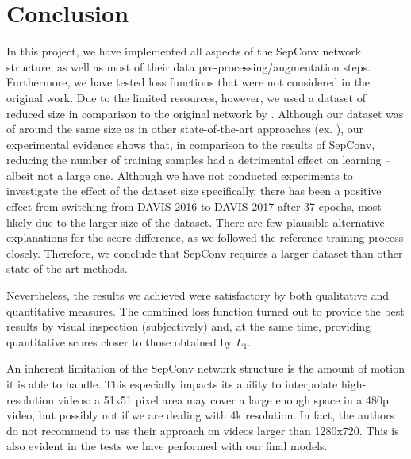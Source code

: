 \documentclass[10pt,twocolumn,letterpaper]{article}
\begin{document}

\vspace{-0.5em}
\section{Conclusion}
\label{sec:conclusion}

\vspace{-0.5em}
In this project, we have implemented all aspects of the SepConv network structure, as well as most of their data pre-processing/augmentation steps. Furthermore, we have tested loss functions that were not considered in the original work. Due to the limited resources, however, we used a dataset of reduced size in comparison to the original network by \citeauthor{SepConv}. Although our dataset was of around the same size as in other state-of-the-art approaches (ex. \cite{PhaseNet}), our experimental evidence shows that, in comparison to the results of SepConv, reducing the number of training samples had a detrimental effect on learning -- albeit not a large one. Although we have not conducted experiments to investigate the effect of the dataset size specifically, there has been a positive effect from switching from DAVIS 2016 to DAVIS 2017 after 37 epochs, most likely due to the larger size of the dataset. There are few plausible alternative explanations for the score difference, as we followed the reference training process closely. Therefore, we conclude that SepConv requires a larger dataset than other state-of-the-art methods.

Nevertheless, the results we achieved were satisfactory by both qualitative and quantitative measures. The combined loss function turned out to provide the best results by visual inspection (subjectively) and, at the same time, providing quantitative scores closer to those obtained by $L_1$.

An inherent limitation of the SepConv network structure is the amount of motion it is able to handle. This especially impacts its ability to interpolate high-resolution videos: a 51x51 pixel area may cover a large enough space in a 480p video, but possibly not if we are dealing with 4k resolution. In fact, the authors do not recommend to use their approach on videos larger than 1280x720. This is also evident in the tests we have performed with our final models.

\end{document}
